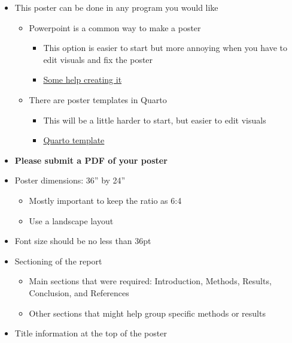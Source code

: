 \documentclass[
  letterpaper,
  DIV=11,
  numbers=noendperiod]{scrartcl}
\providecommand{\tightlist}{%
  \setlength{\itemsep}{0pt}\setlength{\parskip}{0pt}}\usepackage{longtable,booktabs,array}
\begin{document}
\begin{itemize}
\tightlist
\item
  This poster can be done in any program you would like

  \begin{itemize}
  \tightlist
  \item
    Powerpoint is a common way to make a poster

    \begin{itemize}
    \tightlist
    \item
      This option is easier to start but more annoying when you have to
      edit visuals and fix the poster
    \item
      \href{https://www.slidesai.io/blog/how-to-make-a-poster-powerpoint}{Some
      help creating it}
    \end{itemize}
  \item
    There are poster templates in Quarto

    \begin{itemize}
    \tightlist
    \item
      This will be a little harder to start, but easier to edit visuals
    \item
      \href{https://github.com/quarto-ext/typst-templates/tree/main/poster}{Quarto
      template}
    \end{itemize}
  \end{itemize}
\item
  \textbf{Please submit a PDF of your poster}
\item
  Poster dimensions: 36'' by 24''

  \begin{itemize}
  \tightlist
  \item
    Mostly important to keep the ratio as 6:4
  \item
    Use a landscape layout
  \end{itemize}
\item
  Font size should be no less than 36pt
\item
  Sectioning of the report

  \begin{itemize}
  \tightlist
  \item
    Main sections that were required: Introduction, Methods, Results,
    Conclusion, and References
  \item
    Other sections that might help group specific methods or results
  \end{itemize}
\item
  Title information at the top of the poster


\end{itemize}
\end{document}
